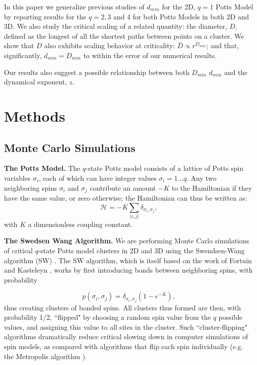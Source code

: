 \documentclass[aps, preprint, groupedaddress]{revtex4}
\newcommand{\lb}{{\langle}}
\newcommand{\rb}{{\rangle}}
\begin{document}
In this paper we generalize previous studies of $d_{min}$ for the 2D, $q=1$ Potts Model by reporting results for the $q = 2, 3$ and $4$ for both Potts Models in both 2D and 3D.  We also study the critical scaling of a related quantity: the diameter, $D$, defined as the longest of all the shortest paths between points on a cluster. 
We show that $D$ also exhibits scaling behavior at criticality: $\bar{D} \propto r^{D_{min}}$; and that, significantly, $d_{min} = D_{min}$ to within the error of our numerical results. 

Our results also suggest a possible relationship between both $D_{min}$ $d_{min}$ and the dynamical exponent, $z$.

\section{Methods}

\subsection{Monte Carlo Simulations}

{\bf The Potts Model.} The $q$-state Potts model consists of a lattice of Potts spin variables $\sigma_i$, each of which can have integer values $\sigma_i = 1 \dots q$.  Any two neighboring spins $\sigma_i$ and $\sigma_j$ contribute an amount $-K$ to the Hamiltonian if they have the same value, or zero otherwise; the Hamiltonian can thus be written as:
\begin{equation}
\mathcal{H} = -K \sum_{\lb i,j \rb} \delta_{\sigma_i, \sigma_j},
\end{equation}     
with $K$ a dimensionless coupling constant.  

{\bf The Swedsen Wang Algorithm.} We are performing Monte Carlo simulations of critical $q$-state Potts model clusters in 2D and 3D using the Swendsen-Wang algorithm (SW) \cite{SwWa86, NeBa99}.  The SW algorithm, which is itself based on the work of Fortuin and Kasteleyn \cite{FoKa}, works by first introducing bonds between neighboring spins, with probability 

\begin{equation}
p(\sigma_i,\sigma_j) = \delta_{\sigma_i, \sigma_j} (1-e^{-K}),
\end{equation}  
thus creating clusters of bonded spins.   All clusters thus formed are then, with probability 1/2, ``flipped" by choosing a random spin value from the $q$ possible values, and assigning this value to all sites in the cluster.  Such ``cluster-flipping" algorithms dramatically reduce critical slowing down in computer simulations of spin models, as compared with algorithms that flip each spin individually \cite{NeBa99} (e.g. the Metropolis algorithm \cite{Met}). 
\end{document}
